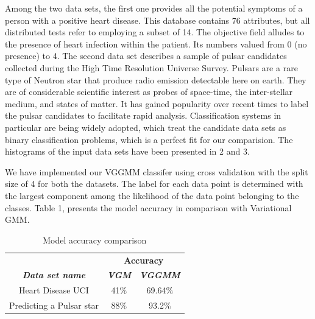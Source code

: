 \documentclass[conference]{IEEEtran}
\begin{document}
    

Among the two data sets, the first one provides all the potential symptoms of a person with a positive heart disease. 
This database contains 76 attributes, but all distributed tests refer to employing a subset of 14. The objective field alludes to the presence of heart infection within the patient. Its numbers valued from 0 (no presence) to 4.
The second data set describes a sample of pulsar candidates collected during the High Time Resolution Universe Survey.
Pulsars are a rare type of Neutron star that produce radio emission detectable here on earth. They are of considerable scientific interest as probes of space-time, the inter-stellar medium, and states of matter.
It has gained popularity over recent times to label the pulsar candidates to facilitate rapid analysis. Classification systems in particular are being widely adopted, which treat the candidate data sets as binary classification problems, which is a perfect fit for our comparision.
The histograms of the input data sets have been presented in \figurename {2} and \figurename {3}. 


We have implemented our VGGMM classifer using cross validation with the split size of 4 for both the datasets. 
The label for each data point is determined with the largest component among the likelihood of the data point belonging to the classes.
Table 1, presents the model accuracy in comparison with Variational GMM.
\begin{table}[h!]
    \caption{Model accuracy comparison}
    \begin{center}
    \begin{tabular}{|c|c|c|}
    \hline
    \textbf{}&\multicolumn{2}{|c|}{\textbf{Accuracy}} \\
    \cline{2-3} 
    \textbf{\textit{Data set name}}& \textbf{\textit{VGM}}& \textbf{\textit{VGGMM}}\\
    \hline
    Heart Disease UCI& 41$\%$&69.64$\%$   \\
    \hline
    Predicting a Pulsar star& 88$\%$&93.2$\%$    \\
    \hline
    \end{tabular}
    \label{tab1}
    \end{center}
\end{table}
\end{document}
